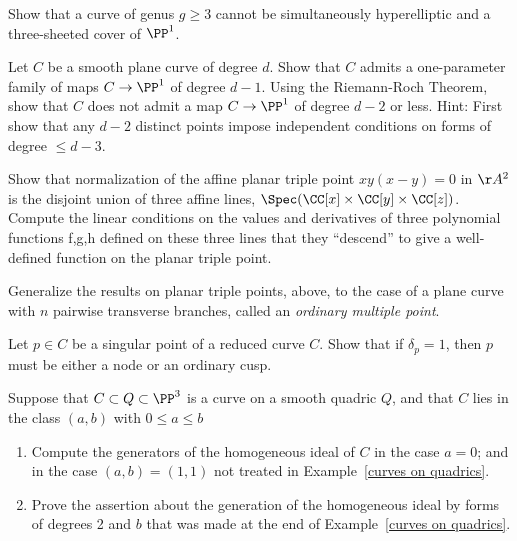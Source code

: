 \begin{exercise}\label{gonality exclusion}
Show that a curve of genus $g \geq 3$ cannot be simultaneously hyperelliptic and a three-sheeted cover of $\PP^1$.
\end{exercise}

\begin{exercise}\label{gonality of smooth plane curve}
Let $C$ be a smooth plane curve of degree $d$. Show that $C$ admits a one-parameter family of maps $C \to \PP^1$ of degree $d-1$. Using the Riemann-Roch Theorem, show that $C$ does not admit a map $C \to \PP^1$ of degree $d-2$ or less. Hint: First show that any $d-2$ distinct points impose independent conditions
on forms of degree $ \leq d-3$.
\end{exercise}

\begin{exercise}\label{planar triple pt}
Show that normalization of the affine planar triple point $xy(x-y) = 0$ in $\AA^2$ is the disjoint union of three
affine lines, $\Spec(\CC[x] \times \CC[y]\times \CC[z])$. Compute the linear conditions on the values and derivatives of three polynomial functions f,g,h defined on
these three lines that they ``descend'' to give a well-defined function on the planar triple point.
\end{exercise}

\begin{exercise} Generalize the results on planar triple points, above, to the case of a plane curve with $n$ pairwise
transverse branches, called an \emph{ordinary multiple point}.
\end{exercise}

\begin{exercise}\label{delta=1 characterization}
Let $p \in C$ be a singular point of a reduced curve $C$. Show that if $\delta_p = 1$, then $p$ must be either a node or an ordinary cusp.
\end{exercise}

\begin{exercise}\label{curve on rank 4 quadric}
 Suppose that $C\subset Q\subset \PP^{3}$ is a curve on a smooth quadric $Q$, and that $C$ lies
 in the class $(a,b)$ with $0\leq a\leq b$
 
\begin{enumerate}
 \item Compute the generators of the homogeneous ideal of $C$ in the case $a=0$; and in the case
 $(a,b) = (1,1)$ not treated in Example~\ref{curves on quadrics}.
 \item Prove the assertion about the generation of the homogeneous ideal by forms of degrees 2 and $b$
 that was made at the end of Example~\ref{curves on quadrics}.
\end{enumerate}
\end{exercise}

